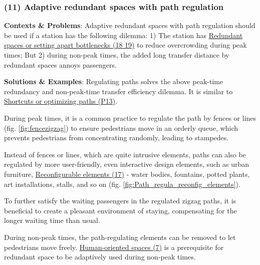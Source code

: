 \documentclass{article}
\begin{document}
\subsubsection{(11) Adaptive redundant spaces with path regulation}
\label{(11) Adaptive redundant spaces with path regulation}

\textbf{Contexts \& Problems}:
Adaptive redundant spaces with path regulation should be used if a station has the following dilemma:
1) The station has \hyperref[(18 19) Redundant spaces or setting apart bottlenecks]{Redundant spaces or setting apart bottlenecks (18 19)} to reduce overcrowding during peak times; But
2) during non-peak times, the added long transfer distance by redundant spaces annoys passengers.


\textbf{Solutions \& Examples}: Regulating paths solves the above peak-time redundancy and non-peak-time transfer efficiency dilemma. It is similar to \hyperref[(P13) Shortcuts or optimizing paths]{Shortcuts or optimizing paths (P13)}.

During peak times, it is a common practice to regulate the path by fences or lines (fig. \ref{fig:fencezigzag}) to ensure pedestrians move in an orderly queue, which prevents pedestrians from concentrating randomly, leading to stampedes. 

Instead of fences or lines, which are quite intrusive elements, paths can also be regulated by more user-friendly, even interactive design elements, such as urban furniture, \hyperref[(17 26) Reconfigurable elements or spaces]{Reconfigurable elements (17)} - water bodies, fountains, potted plants, art installations, stalls, and so on (fig. \ref{fig:Path_regula_reconfig_elements}).

To further satisfy the waiting passengers in the regulated zigzag paths, it is beneficial to create a pleasant environment of staying, compensating for the longer waiting time than usual.

During non-peak times, the path-regulating elements can be removed to let pedestrians move freely. \hyperref[(7) Human-oriented spaces]{Human-oriented spaces (7)} is a prerequisite for redundant space to be adaptively used during non-peak times.
\end{document}
